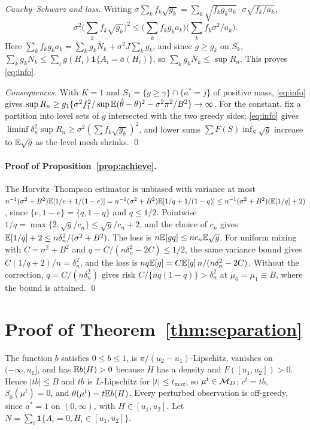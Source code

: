 \emph{Cauchy--Schwarz and loss.} Writing
$\sigma\sum_kf_k\sqrt{g_k}=\sum_k\sqrt{f_kg_ka_k}\cdot\sigma\sqrt{f_k/a_k}$,
\[
\sigma^2\Big(\sum_kf_k\sqrt{g_k}\Big)^2\le\Big(\sum_kf_kg_ka_k\Big)\Big(\sum_kf_k\sigma^2/a_k\Big).
\]
Here $\sum_kf_kg_ka_k=\sum_kg_k\bar N_k+\sigma^2J\sum_kg_k$, and since $g\ge g_k$
on $S_k$, $\sum_kg_kN_k\le\sum_ig(H_i)\mathbf 1\{A_i=\bar a(H_i)\}$, so
$\sum_kg_k\bar N_k\le\sup R_n$. This proves \eqref{eq:info}.

\emph{Consequences.} With $K=1$ and $S_1=\{g\ge\gamma\}\cap\{a^*=j\}$ of positive
mass, \eqref{eq:info} gives
$\sup R_n\ge g_1\{\sigma^2f_1^2/\sup\mathbb{E}(\hat\theta-\theta)^2-\sigma^2\pi^2/B^2\}\to\infty$.
For the constant, fix a partition into level sets of $g$ intersected with the
two greedy sides; \eqref{eq:info} gives
$\liminf\delta_n^2\sup R_n\ge\sigma^2(\sum f_k\sqrt{g_k})^2$, and lower sums
$\sum F(S)\inf_S\sqrt g$ increase to $\mathbb{E}\sqrt g$ as the level mesh shrinks. \qed

\paragraph{Proof of Proposition~\ref{prop:achieve}.} The Horvitz--Thompson
estimator is unbiased with variance at most
$n^{-1}(\sigma^2+B^2)\mathbb{E}[1/e+1/(1-e)]=n^{-1}(\sigma^2+B^2)\mathbb{E}[1/q+1/(1-q)]\le n^{-1}(\sigma^2+B^2)(\mathbb{E}[1/q]+2)$,
since $\{e,1-e\}=\{q,1-q\}$ and $q\le1/2$. Pointwise $1/q=\max\{2,\sqrt g/c_n\}\le\sqrt g/c_n+2$,
and the choice of $c_n$ gives $\mathbb{E}[1/q]+2\le n\delta_n^2/(\sigma^2+B^2)$. The
loss is $n\mathbb{E}[gq]\le nc_n\mathbb{E}\sqrt g$. For uniform mixing with
$C=\sigma^2+B^2$ and $q=C/(n\delta_n^2-2C)\le1/2$, the same variance bound
gives $C(1/q+2)/n=\delta_n^2$, and the loss is $nq\mathbb{E}[g]=C\mathbb{E}[g]\,n/(n\delta_n^2-2C)$.
Without the correction, $q=C/(n\delta_n^2)$ gives risk $C/\{nq(1-q)\}>\delta_n^2$
at $\mu_0=\mu_1\equiv B$, where the bound is attained. \qed

\section{Proof of Theorem~\ref{thm:separation}}\label{app:separation}

The function $b$ satisfies $0\le b\le1$, is $\pi/(u_2-u_1)$-Lipschitz, vanishes on
$(-\infty,u_1]$, and has $\mathbb{E} b(H)>0$ because $H$ has a density and
$F([u_1,u_2])>0$. Hence $|tb|\le B$ and $tb$ is $L$-Lipschitz for
$|t|\le t_{\max}$, so $\mu^t\in\mathcal{M}_D$; $c^t=tb$, $\beta_0(\mu^t)=0$, and
$\theta(\mu^t)=t\mathbb{E} b(H)$. Every perturbed observation is off-greedy, since
$a^*=1$ on $(0,\infty)$, with $H\in[u_1,u_2]$. Let
$N=\sum_i\mathbf 1\{A_i=0,H_i\in[u_1,u_2]\}$.

